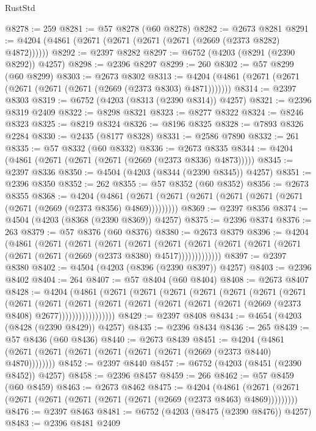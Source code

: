 \begin{lexlean}{RustStd}
\begin{coremodule}
@8278 := 259
@8281 := @57 @8278 (@60 @8278)
@8282 := @2673 @8281
@8291 := @4204 (@4861 (@2671 (@2671 (@2671 (@2671 (@2669 (@2373 @8282) @4872))))))
@8292 := @2397 @8282
@8297 := @6752 (@4203 (@8291 (@2390 @8292)) @4257)
@8298 := @2396 @8297
@8299 := 260
@8302 := @57 @8299 (@60 @8299)
@8303 := @2673 @8302
@8313 := @4204 (@4861 (@2671 (@2671 (@2671 (@2671 (@2671 (@2669 (@2373 @8303) @4871)))))))
@8314 := @2397 @8303
@8319 := @6752 (@4203 (@8313 (@2390 @8314)) @4257)
@8321 := @2396 @8319 @2409
@8322 := @8298 @8321
@8323 := @8277 @8322
@8324 := @8246 @8323
@8325 := @8219 @8324
@8326 := @8196 @8325
@8328 := @7893 @8326 @2284
@8330 := @2435 (@8177 @8328)
@8331 := @2586 @7890
@8332 := 261
@8335 := @57 @8332 (@60 @8332)
@8336 := @2673 @8335
@8344 := @4204 (@4861 (@2671 (@2671 (@2671 (@2669 (@2373 @8336) @4873)))))
@8345 := @2397 @8336
@8350 := @4504 (@4203 (@8344 (@2390 @8345)) @4257)
@8351 := @2396 @8350
@8352 := 262
@8355 := @57 @8352 (@60 @8352)
@8356 := @2673 @8355
@8368 := @4204
    (@4861 (@2671 (@2671 (@2671 (@2671 (@2671 (@2671 (@2671 (@2669 (@2373 @8356) @4869)))))))))
@8369 := @2397 @8356
@8374 := @4504 (@4203 (@8368 (@2390 @8369)) @4257)
@8375 := @2396 @8374
@8376 := 263
@8379 := @57 @8376 (@60 @8376)
@8380 := @2673 @8379
@8396 := @4204
    (@4861
      (@2671
        (@2671
          (@2671
            (@2671
              (@2671
                (@2671 (@2671 (@2671 (@2671 (@2671 (@2671 (@2669 (@2373 @8380) @4517)))))))))))))
@8397 := @2397 @8380
@8402 := @4504 (@4203 (@8396 (@2390 @8397)) @4257)
@8403 := @2396 @8402
@8404 := 264
@8407 := @57 @8404 (@60 @8404)
@8408 := @2673 @8407
@8428 := @4204
    (@4861
      (@2671
        (@2671
          (@2671
            (@2671
              (@2671
                (@2671
                  (@2671
                    (@2671
                      (@2671
                        (@2671
                          (@2671
                            (@2671 (@2671 (@2671 (@2671 (@2669 (@2373 @8408) @2677)))))))))))))))))
@8429 := @2397 @8408
@8434 := @4654 (@4203 (@8428 (@2390 @8429)) @4257)
@8435 := @2396 @8434
@8436 := 265
@8439 := @57 @8436 (@60 @8436)
@8440 := @2673 @8439
@8451 := @4204 (@4861 (@2671 (@2671 (@2671 (@2671 (@2671 (@2671 (@2669 (@2373 @8440) @4870))))))))
@8452 := @2397 @8440
@8457 := @6752 (@4203 (@8451 (@2390 @8452)) @4257)
@8458 := @2396 @8457
@8459 := 266
@8462 := @57 @8459 (@60 @8459)
@8463 := @2673 @8462
@8475 := @4204
    (@4861 (@2671 (@2671 (@2671 (@2671 (@2671 (@2671 (@2671 (@2669 (@2373 @8463) @4869)))))))))
@8476 := @2397 @8463
@8481 := @6752 (@4203 (@8475 (@2390 @8476)) @4257)
@8483 := @2396 @8481 @2409

\end{coremodule}
\end{lexlean}

